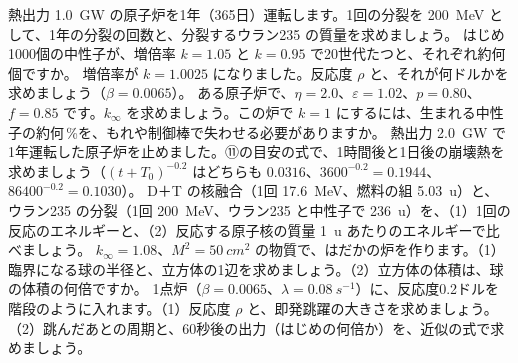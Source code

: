 \bkendproblems
{}
\bkproblem 熱出力 \qty{1.0}{GW} の原子炉を1年（365日）運転します。1回の分裂を \qty{200}{MeV} として、1年の分裂の回数と、分裂するウラン235 の質量を求めましょう。
\bkproblem はじめ1000個の中性子が、増倍率 $k=1.05$ と $k=0.95$ で20世代たつと、それぞれ約何個ですか。
\bkproblem 増倍率が $k=1.0025$ になりました。反応度 $\rho$ と、それが何ドルかを求めましょう（$\beta=0.0065$）。
\bkproblem ある原子炉で、$\eta=2.0$、$\varepsilon=1.02$、$p=0.80$、$f=0.85$ です。$k_\infty$ を求めましょう。この炉で $k=1$ にするには、生まれる中性子の約何\,\%を、もれや制御棒で失わせる必要がありますか。
\bkproblem 熱出力 \qty{2.0}{GW} で1年運転した原子炉を止めました。⑪の目安の式で、1時間後と1日後の崩壊熱を求めましょう（$(t+T_0)^{-0.2}$ はどちらも $0.0316$、$3600^{-0.2}=0.1944$、$\num{86400}^{-0.2}=0.1030$）。
\bkproblem D＋T の核融合（1回 \qty{17.6}{MeV}、燃料の組 \qty{5.03}{u}）と、ウラン235 の分裂（1回 \qty{200}{MeV}、ウラン235 と中性子で \qty{236}{u}）を、（1）1回の反応のエネルギーと、（2）反応する原子核の質量 \qty{1}{u} あたりのエネルギーで比べましょう。
\bkproblem $k_\infty=1.08$、$M^2=\qty{50}{cm^2}$ の物質で、はだかの炉を作ります。（1）臨界になる球の半径と、立方体の1辺を求めましょう。（2）立方体の体積は、球の体積の何倍ですか。
\bkproblem 1点炉（$\beta=0.0065$、$\lambda=\qty{0.08}{s^{-1}}$）に、反応度0.2ドルを階段のように入れます。（1）反応度 $\rho$ と、即発跳躍の大きさを求めましょう。（2）跳んだあとの周期と、60秒後の出力（はじめの何倍か）を、近似の式で求めましょう。
